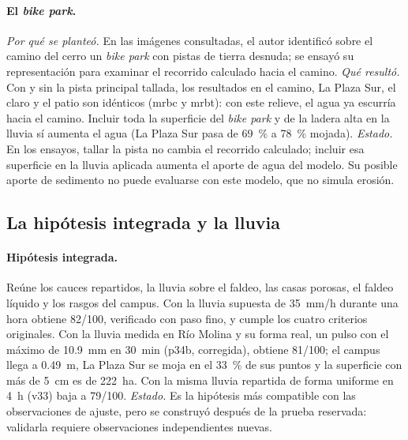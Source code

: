 \paragraph{El \emph{bike park}.} \emph{Por qué se planteó.} En las imágenes consultadas, el autor identificó sobre el camino del cerro un \emph{bike park} con pistas de tierra desnuda; se ensayó su representación para examinar el recorrido calculado hacia el camino. \emph{Qué resultó.} Con y sin la pista principal tallada, los resultados en el camino, La Plaza Sur, el claro y el patio son idénticos (mrbc y mrbt): con este relieve, el agua ya escurría hacia el camino. Incluir toda la superficie del \emph{bike park} y de la ladera alta en la lluvia sí aumenta el agua (La Plaza Sur pasa de \SI{69}{\percent} a \SI{78}{\percent} mojada). \emph{Estado.} En los ensayos, tallar la pista no cambia el recorrido calculado; incluir esa superficie en la lluvia aplicada aumenta el aporte de agua del modelo. Su posible aporte de sedimento no puede evaluarse con este modelo, que no simula erosión.

\subsection{La hipótesis integrada y la lluvia}
\paragraph{Hipótesis integrada.} Reúne los cauces repartidos, la lluvia sobre el faldeo, las casas porosas, el faldeo líquido y los rasgos del campus. Con la lluvia supuesta de \SI{35}{mm/h} durante una hora obtiene 82/100, verificado con paso fino, y cumple los cuatro criterios originales. Con la lluvia medida en Río Molina y su forma real, un pulso con el máximo de \SI{10,9}{mm} en \SI{30}{min} (p34b, corregida), obtiene 81/100; el campus llega a \SI{0,49}{m}, La Plaza Sur se moja en el \SI{33}{\percent} de sus puntos y la superficie con más de \SI{5}{cm} es de \SI{222}{ha}. Con la misma lluvia repartida de forma uniforme en \SI{4}{h} (v33) baja a 79/100.
\emph{Estado.} Es la hipótesis más compatible con las observaciones de ajuste, pero se construyó después de la prueba reservada: validarla requiere observaciones independientes nuevas.

